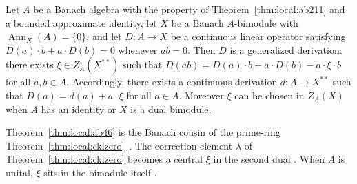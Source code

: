 \begin{theorem}\label{thm:local:ab46}
Let $A$ be a Banach algebra with the property of
Theorem~\ref{thm:local:ab211} and a bounded approximate identity, let $X$
be a Banach $A$-bimodule with $\operatorname{Ann}_X(A)=\{0\}$, and let
$D\colon A\to X$ be a continuous linear operator satisfying
$D(a)\cdot b+a\cdot D(b)=0$ whenever $ab=0$. Then $D$ is a generalized
derivation: there exists $\xi\in Z_A(X^{**})$ such that
$D(ab)=D(a)\cdot b+a\cdot D(b)-a\cdot\xi\cdot b$ for all $a,b\in A$.
Accordingly, there exists a continuous derivation $d\colon A\to X^{**}$
such that $D(a)=d(a)+a\cdot\xi$ for all $a\in A$. Moreover $\xi$ can be
chosen in $Z_A(X)$ when $A$ has an identity or $X$ is a dual bimodule.
\end{theorem}

Theorem~\ref{thm:local:ab46} is the Banach cousin of the prime-ring
Theorem~\ref{thm:local:cklzero}~\cite[p.~156]{AlaminosBresar2009}. The correction element $\lambda$ of
Theorem~\ref{thm:local:cklzero} becomes a central $\xi$ in the second dual
\cite[p.~156]{AlaminosBresar2009}. When $A$ is
unital, $\xi$ sits in the bimodule itself
\cite[p.~156]{AlaminosBresar2009}.

